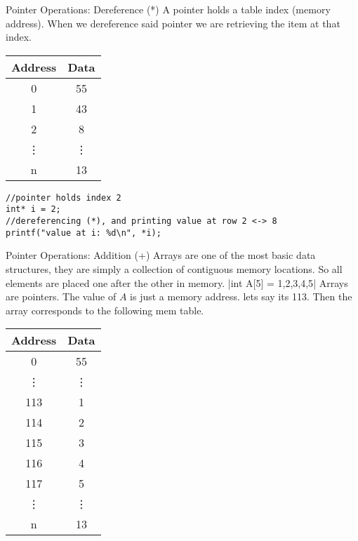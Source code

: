 \documentclass[10pt]{beamer}
\begin{document}
\begin{frame}[fragile]{Pointer Operations: Dereference (*)}
A pointer holds a table index (memory address). When we dereference said pointer we are retrieving the item at that index.

\begin{tabular}{|c|c|}
		\hline
		Address & Data\\
		\hline
		0 & 55 \\
		\hline
		1 & 43 \\
		\hline
		2 & 8 \\
		\hline
		\vdots & \vdots \\
		\hline
		n & 13\\
		\hline
	\end{tabular}
\begin{verbatim}
//pointer holds index 2
int* i = 2;
//dereferencing (*), and printing value at row 2 <-> 8
printf("value at i: %d\n", *i);
\end{verbatim}
\end{frame}

\begin{frame}[fragile]{Pointer Operations: Addition (+)}
Arrays are one of the most basic data structures, they are simply a collection of contiguous memory locations. So all elements are placed one after the other in memory.
|int A[5] = {1,2,3,4,5}|
Arrays are pointers. The value of $A$ is just a memory address. lets say its 113. Then the array corresponds to the following mem table.
\begin{tabular}{|c|c|}
		\hline
		Address & Data\\
		\hline
		0 & 55 \\
		\hline
		\vdots & \vdots \\
		\hline
		113 & 1\\
		\hline
		114 & 2 \\
		\hline
		115 & 3 \\
		\hline
		116 & 4 \\
		\hline
		117 & 5 \\
		\hline
		\vdots & \vdots \\
		n & 13\\
		\hline
	\end{tabular}

\end{frame}
\end{document}
